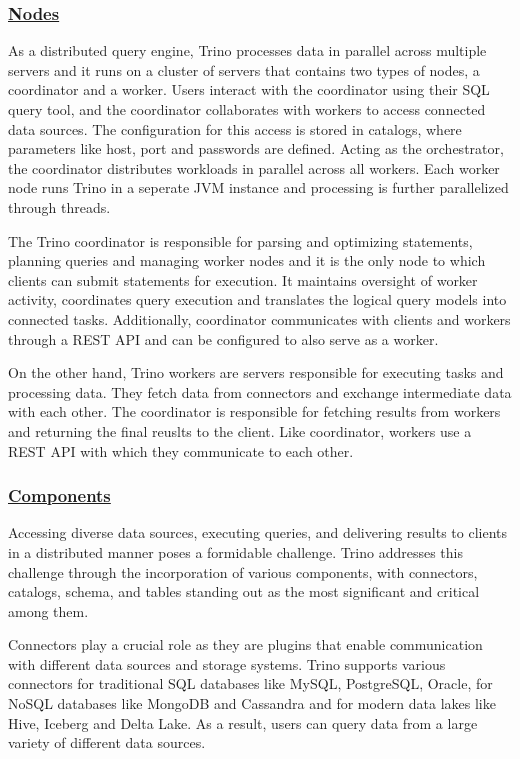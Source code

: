 \documentclass[conference]{IEEEtran}
\begin{document}
\subsubsection{\textbf{\underline{Nodes}}}
As a distributed query engine, Trino processes data in parallel across multiple servers and it runs on a cluster of servers that contains two types of nodes, 
a coordinator and a worker. Users interact with the coordinator using their SQL query tool, and the coordinator collaborates with workers to access connected
data sources. The configuration for this access is stored in catalogs, where parameters like host, port and passwords are defined. Acting as the orchestrator,
the coordinator distributes workloads in parallel across all workers. Each worker node runs Trino in a seperate JVM instance and processing is further parallelized through threads.

The Trino coordinator is responsible for parsing and optimizing statements, planning queries and managing worker nodes and it is the only node to which clients can submit 
statements for execution. It maintains oversight of worker activity, coordinates query execution and translates the logical query models into connected tasks. Additionally, 
coordinator communicates with clients and workers through a REST API and can be configured to also serve as a worker.

On the other hand, Trino workers are servers responsible for executing tasks and processing data. They fetch data from connectors and exchange intermediate data with
each other. The coordinator is responsible for fetching results from workers and returning the final reuslts to the client. Like coordinator, workers use a REST API 
with which they communicate to each other.

\subsubsection{\textbf{\underline{Components}}}
Accessing diverse data sources, executing queries, and delivering results to clients in a distributed manner poses a formidable challenge. Trino addresses this challenge through 
the incorporation of various components, with connectors, catalogs, schema, and tables standing out as the most significant and critical among them.

Connectors play a crucial role as they are plugins that enable communication with different data sources and storage systems.
Trino supports various connectors for traditional SQL databases like MySQL, PostgreSQL, Oracle, for NoSQL databases like MongoDB and Cassandra and for modern data lakes like 
Hive, Iceberg and Delta Lake. As a result, users can query data from a large variety of different data sources.
\end{document}
